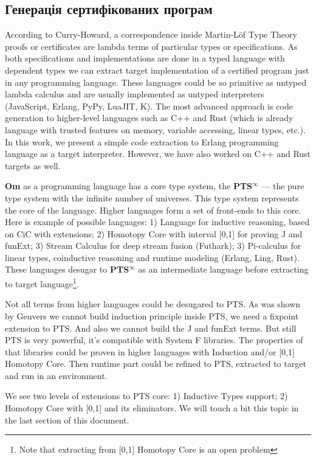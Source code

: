 \subsection{Генерація сертифікованих програм}
According to Curry-Howard, a correspondence inside Martin-Löf Type Theory\cite{Lof84} proofs or certificates are lambda terms of particular types or specifications.
As both specifications and implementations are done in a typed language with dependent types we can extract target implementation of a certified program just in any programming language.
These languages could be so primitive as untyped lambda calculus and are usually implemented as untyped interpreters (JavaScript, Erlang, PyPy, LuaJIT, K).
The most advanced approach is code generation to higher-level languages such as C++ and Rust (which is already language with trusted features on memory, variable accessing, linear types, etc.).
In this work, we present a simple code extraction to Erlang programming language as a target interpreter.
However, we have also worked on C++ and Rust targets as well.

{\bf Om} as a programming language has a core type system, the {\bf PTS$^{\infty}$} --- the pure type system with the infinite number of universes.
This type system represents the core of the language.
Higher languages form a set of front-ends to this core.
 Here is example of possible languages:
1) Language for inductive reasoning, based on CiC with extensions;
2) Homotopy Core with interval [0,1] for proving J and funExt;
3) Stream Calculus for deep stream fusion (Futhark);
3) Pi-calculus for linear types, coinductive reasoning and runtime modeling (Erlang, Ling, Rust).
These languages desugar to {\bf PTS$^{\infty}$} as an intermediate language before extracting to target language\footnote{Note that extracting from [0,1] Homotopy Core is an open problem}.

Not all terms from higher languages could be desugared to PTS.
As was shown by Geuvers\cite{Geuvers01} we cannot build induction principle inside PTS, we need a fixpoint extension to PTS.
And also we cannot build the J and funExt terms.
But still PTS is very powerful, it's compatible with System F libraries.
The properties of that libraries could be proven in higher languages with Induction and/or [0,1] Homotopy Core.
Then runtime part could be refined to PTS, extracted to target and run in an environment.

We see two levels of extensions to PTS core: 1) Inductive Types support; 2) Homotopy Core with [0,1] and its eliminators.
We will touch a bit this topic in the last section of this document.


